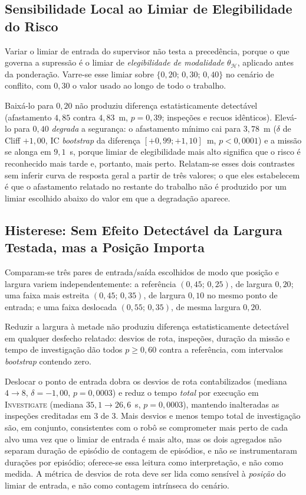 \subsection{Sensibilidade Local ao Limiar de Elegibilidade do Risco}
\label{sec:res-sens-limiar}

Variar o limiar de entrada do supervisor não testa a precedência, porque o que
governa a supressão é o limiar de \emph{elegibilidade de modalidade}
$\theta_{\mathcal{H}}$, aplicado antes da ponderação. Varre-se esse limiar sobre
$\{0{,}20;\,0{,}30;\,0{,}40\}$ no cenário de conflito, com $0{,}30$ o valor usado ao
longo de todo o trabalho.

Baixá-lo para $0{,}20$ não produziu diferença estatisticamente detectável
(afastamento $4{,}85$ contra $4{,}83$~m, $p=0{,}39$; inspeções e recuos idênticos).
Elevá-lo para $0{,}40$ \emph{degrada} a segurança: o afastamento mínimo cai para
$3{,}78$~m ($\delta$ de Cliff $+1{,}00$, IC \textit{bootstrap} da diferença
$[+0{,}99;+1{,}10]$~m, $p<0{,}0001$) e a missão se alonga em $9{,}1$~s, porque limiar
de elegibilidade mais alto significa que o risco é reconhecido mais tarde e, portanto,
mais perto. Relatam-se esses dois contrastes sem inferir curva de resposta geral a
partir de três valores; o que eles estabelecem é que o afastamento relatado no
restante do trabalho não é produzido por um limiar escolhido abaixo do valor em que a
degradação aparece.

\subsection{Histerese: Sem Efeito Detectável da Largura Testada, mas a Posição Importa}
\label{sec:res-histerese}

Comparam-se três pares de entrada/saída escolhidos de modo que posição e largura
variem independentemente: a referência $(0{,}45;\,0{,}25)$, de largura $0{,}20$; uma
faixa mais estreita $(0{,}45;\,0{,}35)$, de largura $0{,}10$ no mesmo ponto de
entrada; e uma faixa deslocada $(0{,}55;\,0{,}35)$, de mesma largura $0{,}20$.

Reduzir a largura à metade não produziu diferença estatisticamente detectável em
qualquer desfecho relatado: desvios de rota, inspeções, duração da missão e tempo de
investigação dão todos $p\ge0{,}60$ contra a referência, com intervalos
\textit{bootstrap} contendo zero.

Deslocar o ponto de entrada dobra os desvios de rota contabilizados (mediana
$4\rightarrow8$, $\delta=-1{,}00$, $p=0{,}0003$) e reduz o tempo \emph{total} por
execução em \textsc{Investigate} (mediana $35{,}1\rightarrow26{,}6$~s, $p=0{,}0003$),
mantendo inalteradas as inspeções creditadas em $3$ de $3$. Mais desvios e menos
tempo total de investigação são, em conjunto, consistentes com o robô se comprometer
mais perto de cada alvo uma vez que o limiar de entrada é mais alto, mas os dois
agregados não separam duração de episódio de contagem de episódios, e não se
instrumentaram durações por episódio; oferece-se essa leitura como interpretação, e
não como medida. A métrica de desvios de rota deve ser lida como sensível à
\emph{posição} do limiar de entrada, e não como contagem intrínseca do cenário.

